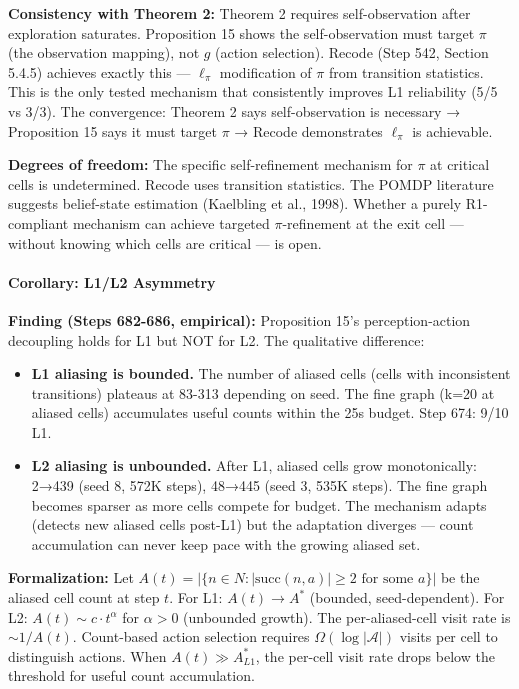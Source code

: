 \documentclass[
  11pt,
]{article}
\providecommand{\tightlist}{%
  \setlength{\itemsep}{0pt}\setlength{\parskip}{0pt}}
\begin{document}
\textbf{Consistency with Theorem 2:} Theorem 2 requires self-observation
after exploration saturates. Proposition 15 shows the self-observation
must target \(\pi\) (the observation mapping), not \(g\) (action
selection). Recode (Step 542, Section 5.4.5) achieves exactly this ---
\(\ell_\pi\) modification of \(\pi\) from transition statistics. This is
the only tested mechanism that consistently improves L1 reliability (5/5
vs 3/3). The convergence: Theorem 2 says self-observation is necessary →
Proposition 15 says it must target \(\pi\) → Recode demonstrates
\(\ell_\pi\) is achievable.

\textbf{Degrees of freedom:} The specific self-refinement mechanism for
\(\pi\) at critical cells is undetermined. Recode uses transition
statistics. The POMDP literature suggests belief-state estimation
(Kaelbling et al., 1998). Whether a purely R1-compliant mechanism can
achieve targeted \(\pi\)-refinement at the exit cell --- without knowing
which cells are critical --- is open.

\paragraph{Corollary: L1/L2 Asymmetry}\label{corollary-l1l2-asymmetry}

\textbf{Finding (Steps 682-686, empirical):} Proposition 15's
perception-action decoupling holds for L1 but NOT for L2. The
qualitative difference:

\begin{itemize}
\tightlist
\item
  \textbf{L1 aliasing is bounded.} The number of aliased cells (cells
  with inconsistent transitions) plateaus at 83-313 depending on seed.
  The fine graph (k=20 at aliased cells) accumulates useful counts
  within the 25s budget. Step 674: 9/10 L1.
\item
  \textbf{L2 aliasing is unbounded.} After L1, aliased cells grow
  monotonically: 2→439 (seed 8, 572K steps), 48→445 (seed 3, 535K
  steps). The fine graph becomes sparser as more cells compete for
  budget. The mechanism adapts (detects new aliased cells post-L1) but
  the adaptation diverges --- count accumulation can never keep pace
  with the growing aliased set.
\end{itemize}

\textbf{Formalization:} Let
\(A(t) = |\{n \in N : |\text{succ}(n, a)| \geq 2 \text{ for some } a\}|\)
be the aliased cell count at step \(t\). For L1: \(A(t) \to A^*\)
(bounded, seed-dependent). For L2: \(A(t) \sim c \cdot t^\alpha\) for
\(\alpha > 0\) (unbounded growth). The per-aliased-cell visit rate is
\(\sim 1/A(t)\). Count-based action selection requires
\(\Omega(\log |\mathcal{A}|)\) visits per cell to distinguish actions.
When \(A(t) \gg A^*_{L1}\), the per-cell visit rate drops below the
threshold for useful count accumulation.
\end{document}
